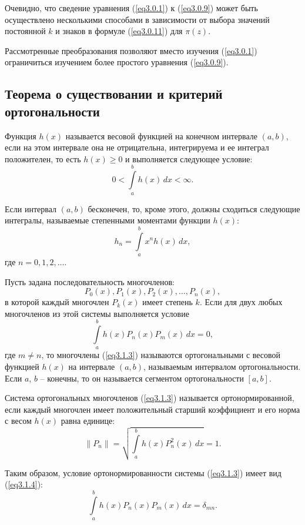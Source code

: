 Очевидно, что сведение уравнения (\ref{eq3.0.1}) к (\ref{eq3.0.9}) может быть
осуществлено несколькими способами в зависимости от выбора значений постоянной
\( k \) и знаков в формуле (\ref{eq3.0.11}) для \( \pi(z) \).

Рассмотренные преобразования позволяют вместо изучения (\ref{eq3.0.1})
ограничиться изучением более простого уравнения (\ref{eq3.0.9}).

\subsection{Теорема о существовании и критерий ортогональности}

\begin{definition}
    Функция \( h(x) \) называется весовой функцией на конечном интервале
    \( (a, b) \), если на этом интервале она не отрицательна, интегрируема и ее
    интеграл положителен, то есть \( h(x) \ge 0 \) и выполняется следующее
    условие:
    \[
        0 < \int\limits_a^b h(x)\,dx < \infty.
    \]
    
    Если интервал \( (a, b) \) бесконечен, то, кроме этого, должны сходиться
    следующие интегралы, называемые степенными моментами функции \( h(x) \):
    \[
        h_n = \int\limits_a^b x^n h(x)\,dx,
    \]
    где \( n = 0, 1, 2, \ldots \).
\end{definition}

Пусть задана последовательность многочленов:
\begin{equation}
    P_0(x), P_1(x), P_2(x), \ldots, P_n(x),
    \label{eq3.1.3}
\end{equation}
в которой каждый многочлен \( P_k(x) \) имеет степень \( k \).
Если для двух любых многочленов из этой системы выполняется условие
\[
    \int\limits_a^b h(x)P_n(x)P_m(x)\,dx = 0,
\]
где \( m \ne n \), то многочлены (\ref{eq3.1.3}) называются ортогональными с
весовой функцией \( h(x) \) на интервале \( (a, b) \), называемым интервалом
ортогональности. Если \( a \), \( b \) -- конечны, то он называется сегментом
ортогональности \( [a, b] \).

\begin{definition}
    Система ортогональных многочленов (\ref{eq3.1.3}) называется
    ортонормированной, если каждый многочлен имеет положительный старший
    коэффициент и его норма с весом \( h(x) \) равна единице:
    \[
        \| P_n \| = \sqrt{\int\limits_a^b h(x)P_n^2(x)\,dx} = 1.
    \]
\end{definition}

Таким образом, условие ортонормированности системы (\ref{eq3.1.3}) имеет вид
(\ref{eq3.1.4}):
\begin{equation}
    \int\limits_a^b h(x)P_n(x)P_m(x)\,dx = \delta_{mn}.
    \label{eq3.1.4}
\end{equation}

